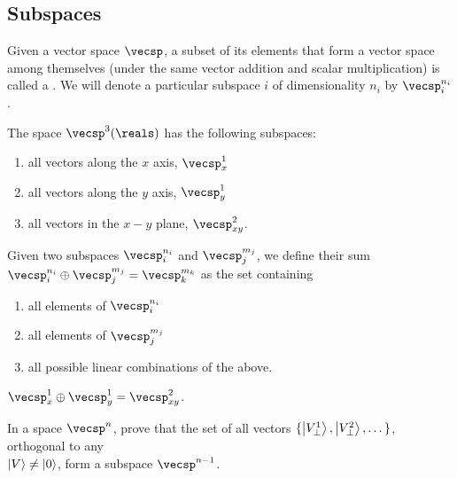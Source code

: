 \subsection{Subspaces}

Given a vector space $\vecsp$, a subset of its elements that form a vector space among themselves (under the same vector addition and scalar multiplication) is called a . We will denote a particular subspace $i$ of dimensionality $n_i$ by $\vecsp_i^{n_i}$.

\begin{example}
The space $\vecsp^3(\reals)$ has the following subspaces:
\begin{enumerate}
    \item all vectors along the $x$ axis, $\vecsp_x^{1}$
    \item all vectors along the $y$ axis, $\vecsp_y^{1}$
    \item all vectors in the $x-y$ plane, $\vecsp_{xy}^{2}$.
\end{enumerate}
\end{example}

\begin{shaded*}
Given two subspaces $\vecsp_i^{n_i}$ and $\vecsp_j^{m_j}$, we define their sum $\vecsp_i^{n_i} \oplus \vecsp_j^{m_j} = \vecsp_k^{m_k}$ as the set containing
\begin{enumerate}
    \item all elements of $\vecsp_i^{n_i}$
    \item all elements of $\vecsp_j^{m_j}$
    \item all possible linear combinations of the above.
\end{enumerate}
\end{shaded*}

\begin{example}
$\vecsp_x^{1} \oplus \vecsp_y^{1} = \vecsp_{xy}^{2}$.
\end{example}

\begin{exercise}
In a space $\vecsp^n$, prove that the set of all vectors $\{\ket{V_\perp^1}, \ket{V_\perp^2}, \dots\}$, orthogonal to any \\$\ket{V} \neq \ket{0}$, form a subspace $\vecsp^{n - 1}$.
\end{exercise}

